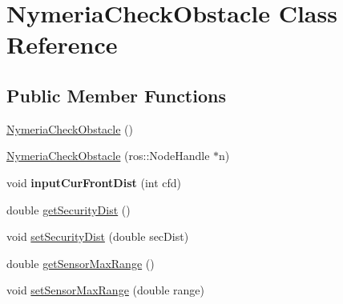 \hypertarget{classNymeriaCheckObstacle}{\section{\-Nymeria\-Check\-Obstacle \-Class \-Reference}
\label{classNymeriaCheckObstacle}
}
\subsection*{\-Public \-Member \-Functions}
\begin{DoxyCompactItemize}
\item 
\hyperlink{classNymeriaCheckObstacle_a1f04bd678ea83029bcf54c3100f7c3c8}{\-Nymeria\-Check\-Obstacle} ()
\item 
\hyperlink{classNymeriaCheckObstacle_a6e99c59339b970f92602628dcaf982fb}{\-Nymeria\-Check\-Obstacle} (ros\-::\-Node\-Handle $\ast$n)
\item 
\hypertarget{classNymeriaCheckObstacle_a4232159e2b12378f489291374a325510}{void {\bfseries input\-Cur\-Front\-Dist} (int cfd)}\label{classNymeriaCheckObstacle_a4232159e2b12378f489291374a325510}

\item 
double \hyperlink{classNymeriaCheckObstacle_ace7bb41e1f1b18b170c528825531d75d}{get\-Security\-Dist} ()
\item 
void \hyperlink{classNymeriaCheckObstacle_a4b0be19492123996bed7775ba3d4364a}{set\-Security\-Dist} (double sec\-Dist)
\item 
double \hyperlink{classNymeriaCheckObstacle_a6c827aca5d2d91b52ddb0f4eca3dab24}{get\-Sensor\-Max\-Range} ()
\item 
void \hyperlink{classNymeriaCheckObstacle_a6c44d6701d4f9de0a21dc9d85215c3e3}{set\-Sensor\-Max\-Range} (double range)
\end{DoxyCompactItemize}


